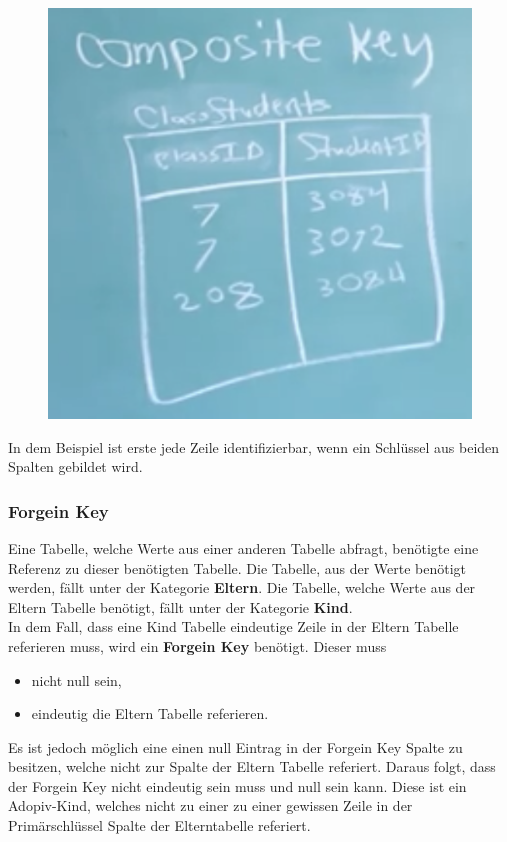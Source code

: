 \begin{figure}[H]
	\centering
	\includegraphics[scale = 0.3]{attachment/chapter_3/Scc030}
	\caption{}
	\label{fig:Scc030}
\end{figure}
In dem Beispiel ist erste jede Zeile identifizierbar, wenn ein Schlüssel aus beiden Spalten gebildet wird.


\subsubsection{Forgein Key}
Eine Tabelle, welche Werte aus einer anderen Tabelle abfragt, benötigte eine Referenz zu dieser benötigten Tabelle. Die Tabelle, aus der Werte benötigt werden, fällt unter der Kategorie \textbf{Eltern}. Die Tabelle, welche Werte aus der Eltern Tabelle benötigt, fällt unter der Kategorie \textbf{Kind}.\\

In dem Fall, dass eine Kind Tabelle eindeutige Zeile in der Eltern Tabelle referieren muss, wird ein \textbf{Forgein Key} benötigt. Dieser muss
\begin{itemize}
\item nicht null sein,
\item eindeutig die Eltern Tabelle referieren.
\end{itemize}
Es ist jedoch möglich eine einen null Eintrag in der Forgein Key Spalte zu besitzen, welche nicht zur Spalte der Eltern Tabelle referiert. Daraus folgt, dass der Forgein Key nicht eindeutig sein muss und null sein kann. Diese ist ein Adopiv-Kind, welches nicht zu einer zu einer gewissen Zeile in der Primärschlüssel Spalte der Elterntabelle referiert. 
